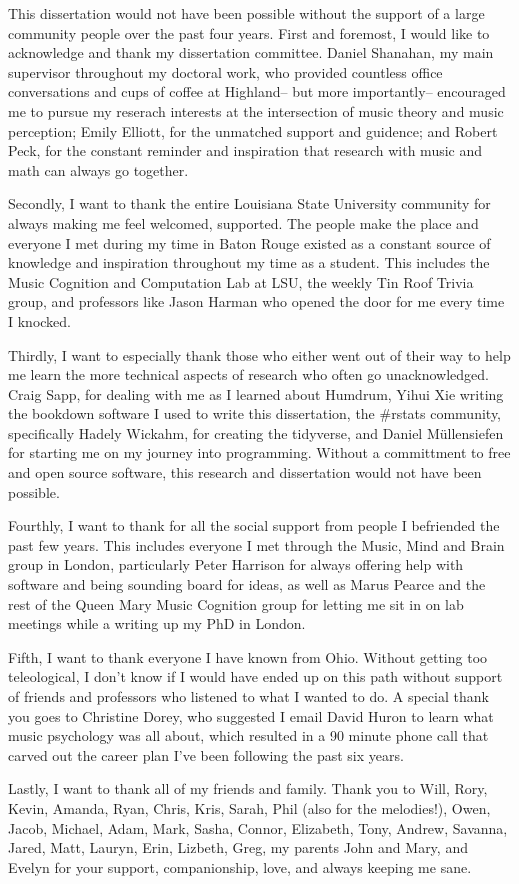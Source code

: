 This dissertation would not have been possible without the support of a large community people over the past four years.
First and foremost, I would like to acknowledge and thank my dissertation committee.
Daniel Shanahan, my main supervisor throughout my doctoral work, who provided countless office conversations and cups of coffee at Highland-- but more importantly-- encouraged me to pursue my reserach interests at the intersection of music theory and music perception; Emily Elliott, for the unmatched support and guidence; and Robert Peck, for the constant reminder and inspiration that research with music and math can always go together.

Secondly, I want to thank the entire Louisiana State University community for always making me feel welcomed, supported.
The people make the place and everyone I met during my time in Baton Rouge existed as a constant source of knowledge and inspiration throughout my time as a student.
This includes the Music Cognition and Computation Lab at LSU, the weekly Tin Roof Trivia group, and professors like Jason Harman who opened the door for me every time I knocked.

Thirdly, I want to especially thank those who either went out of their way to help me learn the more technical aspects of research who often go unacknowledged.
Craig Sapp, for dealing with me as I learned about Humdrum, Yihui Xie writing the bookdown software I used to write this dissertation, the \#rstats community, specifically Hadely Wickahm, for creating the tidyverse, and Daniel Müllensiefen for starting me on my journey into programming.
Without a committment to free and open source software, this research and dissertation would not have been possible.

Fourthly, I want to thank for all the social support from people I befriended the past few years.
This includes everyone I met through the Music, Mind and Brain group in London, particularly Peter Harrison for always offering help with software and being sounding board for ideas, as well as Marus Pearce and the rest of the Queen Mary Music Cognition group for letting me sit in on lab meetings while a writing up my PhD in London.

Fifth, I want to thank everyone I have known from Ohio.
Without getting too teleological, I don't know if I would have ended up on this path without support of friends and professors who listened to what I wanted to do.
A special thank you goes to Christine Dorey, who suggested I email David Huron to learn what music psychology was all about, which resulted in a 90 minute phone call that carved out the career plan I've been following the past six years.

Lastly, I want to thank all of my friends and family.
Thank you to Will, Rory, Kevin, Amanda, Ryan, Chris, Kris, Sarah, Phil (also for the melodies!), Owen, Jacob, Michael, Adam, Mark, Sasha, Connor, Elizabeth, Tony, Andrew, Savanna, Jared, Matt, Lauryn, Erin, Lizbeth, Greg, my parents John and Mary, and Evelyn for your support, companionship, love, and always keeping me sane.
